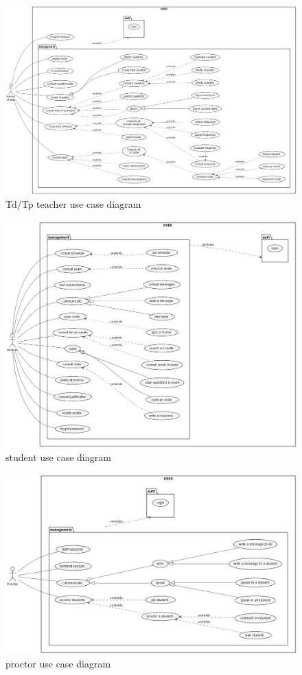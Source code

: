 \documentclass[a4paper,12p]{article}
\begin{document}
    \begin{figure}[h]
        \centering
        \includegraphics[width=\textwidth]{TP TD_Teacher}
        \caption{Td/Tp teacher use case diagram}
    \end{figure}

    \begin{figure}[h]
        \centering
        \includegraphics[width=\textwidth]{student_UCD}
        \caption{student use case diagram}
    \end{figure}

    \begin{figure}[h]
        \centering
        \includegraphics[width=\textwidth]{proctor_UCD}
        \caption{proctor use case diagram}
    \end{figure}
\end{document}
